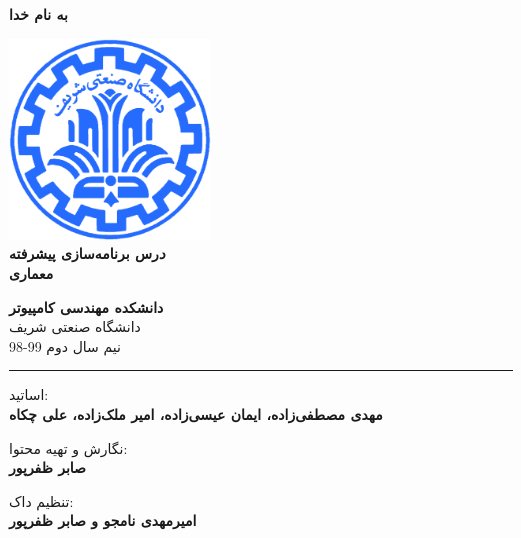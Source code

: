 \documentclass[]{article}
\begin{document}
\begin{titlepage}
\begin{center}

\textbf{ \Huge{به نام خدا} }
        
\vspace{0.2cm}

\includegraphics[width=0.4\textwidth]{sharif1.png}\\
\vspace{0.2cm}
\textbf{ \Huge{\emph درس برنامه‌سازی پیشرفته} }\\
\vspace{0.25cm}
\textbf{ \Large{معماری } }
\vspace{0.2cm}
       
 
      \large \textbf{دانشکده مهندسی کامپیوتر}\\\vspace{0.1cm}
    \large   دانشگاه صنعتی شریف\\\vspace{0.2cm}
       \large   ﻧﯿﻢ سال دوم 99-98 \\\vspace{0.10cm}
      \noindent\rule[1ex]{\linewidth}{1pt}
اساتید:\\
    \textbf{{مهدی مصطفی‌زاده، ایمان عیسی‌زاده، امیر ملک‌زاده، علی چکاه}}



        \vspace{0.10cm}
نگارش و تهیه محتوا:\\
    \textbf{{صابر ظفرپور}}
    
       \vspace{0.10cm}
       تنظیم داک:\\
    \textbf{{امیرمهدی نامجو و صابر ظفرپور}}

    
        \vspace{0.05cm}
    

\end{center}
\end{titlepage}
\end{document}
